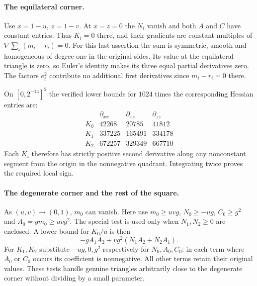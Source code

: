 \documentclass[11pt,a4paper]{article}
\numberwithin{equation}{section}
\theoremstyle{definition}
\theoremstyle{remark}
\begin{document}
\paragraph{The equilateral corner.}
Use $x=1-u,\ z=1-v$. At $x=z=0$ the $N_i$ vanish and both $A$ and $C$ have constant entries. Thus $K_i=0$ there, and their gradients are constant multiples of $\nabla\sum_i(m_i-r_i)=0$. For this last assertion the sum is symmetric, smooth and homogeneous of degree one in the original sides. Its value at the equilateral triangle is zero, so Euler's identity makes its three equal partial derivatives zero. The factors $e_i^2$ contribute no additional first derivatives since $m_i-r_i=0$ there.

On $[0,2^{-14}]^2$ the verified lower bounds for $1024$ times the corresponding Hessian entries are:
\[
\begin{array}{c|rrr}
 &\partial_{xx}&\partial_{xz}&\partial_{zz}\\ \hline
 K_0&42268&20785&41812\\
 K_1&337225&165491&334178\\
 K_2&672257&329349&667710
\end{array}
\]
Each $K_i$ therefore has strictly positive second derivative along any nonconstant segment from the origin in the nonnegative quadrant. Integrating twice proves the required local sign.

\paragraph{The degenerate corner and the rest of the square.}
As $(u,v)\to(0,1)$, $m_0$ can vanish. Here use $m_0\ge uvg$, $N_0\ge-ug$, $C_0\ge g^2$ and $A_0=g m_0\ge uv g^2$. The special test is used only when $N_1,N_2\ge0$ are enclosed. A lower bound for $K_0/u$ is then
\[
 -gA_1A_2+vg^2(N_1A_2+N_2A_1).
\]
For $K_1,K_2$ substitute $-ug,0,g^2$ respectively for $N_0,A_0,C_0$: in each term where $A_0$ or $C_0$ occurs its coefficient is nonnegative. All other terms retain their original values. These tests handle genuine triangles arbitrarily close to the degenerate corner without dividing by a small parameter.
\end{document}
